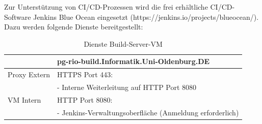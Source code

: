 Zur Unterstützung von CI/CD-Prozessen wird die frei erhältliche CI/CD-Software Jenkins Blue Ocean eingesetzt (https://jenkins.io/projects/blueocean/). Dazu werden folgende Dienste bereitgestellt:\par\bigskip
\begin{table}[H]\caption{Dienste Build-Server-VM}\label{tbl:diebuild}
\begin{tabularx}{\textwidth}{|l|X|}
	\hline
	&  \textbf{pg-rio-build.Informatik.Uni-Oldenburg.DE}\\ 
	\hline Proxy Extern
	& HTTPS Port 443:\\
	& - Interne Weiterleitung auf HTTP Port 8080\\
	\hline VM Intern
	&  HTTP Port 8080:\\
	& - Jenkins-Verwaltungsoberfläche (Anmeldung erforderlich)\\	 
	\hline
\end{tabularx}
\end{table} 
\par\bigskip 

